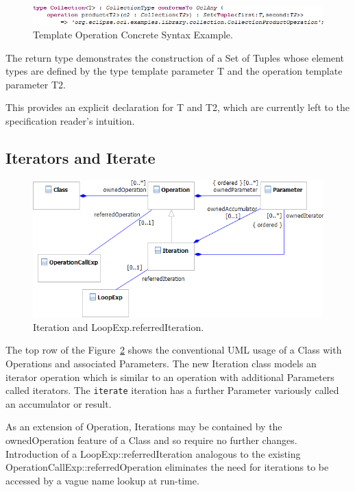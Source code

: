 \documentclass{eceasst}
\begin{document}
\begin{figure}
  \begin{center}
    \includegraphics[width=5.75in]{TemplateOperation.png}
  \end{center}
  \caption{Template Operation Concrete Syntax Example.}
  \label{fig:TemplateOperation}
\end{figure}

The return type demonstrates the construction of a Set of Tuples whose element types are defined by the type template parameter T and the operation template parameter T2.

This provides an explicit declaration for T and T2, which are currently left to the specification reader's intuition.

\subsection{Iterators and Iterate}

\begin{figure}
  \begin{center}
    \includegraphics[width=5.0in]{Iteration.png}
  \end{center}
  \caption{Iteration and LoopExp.referredIteration.}
  \label{fig:Iteration}
\end{figure}

The top row of the Figure~\ref{fig:Iteration} shows the conventional UML usage of a Class with Operations and associated Parameters. The new Iteration class models an iterator operation which is similar to an operation with additional Parameters called iterators. The \verb|iterate| iteration has a further Parameter variously called an accumulator or result. 

As an extension of Operation, Iterations may be contained by the ownedOperation feature of a Class and so require no further changes. Introduction of a LoopExp::referredIteration analogous to the existing OperationCallExp::referredOperation eliminates the need for iterations to be accessed by a vague name lookup at run-time.
\end{document}
